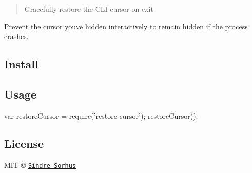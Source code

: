 \begin{quote}
Gracefully restore the C\+LI cursor on exit \end{quote}


Prevent the cursor you\textquotesingle{}ve hidden interactively to remain hidden if the process crashes.

\subsection*{Install}




\subsection*{Usage}


\begin{DoxyCode}
var restoreCursor = require('restore-cursor');
restoreCursor();
\end{DoxyCode}


\subsection*{License}

M\+IT © \href{http://sindresorhus.com}{\tt Sindre Sorhus} 
